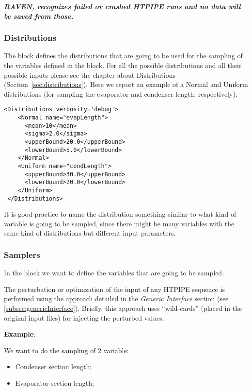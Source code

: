 \textbf{\textit{\nb RAVEN, recognizes failed or crashed HTPIPE runs and no data will be saved from those.}}

\subsubsection{Distributions}
The  block defines the distributions that are going
to be used for the sampling of the variables defined in the  block.
%
For all the possible distributions and all their possible inputs please see the
chapter about Distributions (Section~\ref{sec:distributions}).
%
Here we report an example of a Normal and Uniform distributions (for sampling the evaporator and condenser length, respectively):

\begin{lstlisting}[style=XML,morekeywords={name,debug}]
<Distributions verbosity='debug'>
    <Normal name="evapLength">
      <mean>10</mean>
      <sigma>2.0</sigma>
      <upperBound>20.0</upperBound>
      <lowerBound>5.0</lowerBound>
    </Normal>
    <Uniform name="condLength">
      <upperBound>30.0</upperBound>
      <lowerBound>20.0</lowerBound>
    </Uniform>
 </Distributions>
\end{lstlisting}

\noindent
It is good practice to name the distribution something similar to what kind of
variable is going to be sampled, since there might be many variables with the
same kind of distributions but different input parameters.

\subsubsection{Samplers}
In the  block we want to define the variables that are going to be sampled.

\noindent The perturbation or optimization of the input of any HTPIPE sequence is performed using the approach detailed in the \textit{Generic Interface} section (see \ref{subsec:genericInterface}). 
Briefly, this approach uses
 ``wild-cards'' (placed in the original input files) for injecting the perturbed values.

\textbf{Example}:

We want to do the sampling of 2 variable:
\begin{itemize}
  \item Condenser section length;
  \item Evaporator section length;
\end{itemize}

